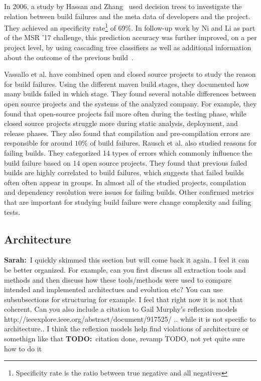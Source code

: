 \documentclass[sigplan, anonymous, review]{acmart}
\newcommand{\sn}[1]{{\color{blue}\textbf{Sarah:}~#1}}
\newcommand{\todo}[1]{{ \color{red} \textbf{TODO:}~#1}}
\begin{document}
In 2006, a study by Hassan and Zhang~\cite{Pred-Tree} used decision trees to investigate the relation between build failures and the meta data of developers and the project.
They achieved an specificity rate\footnote{Specificity rate is the ratio between true negative and all negatives} of 69\%.
In follow-up work by Ni and Li as part of the MSR '17 challenge, this prediction accuracy was further improved, on a per project level, by using cascading tree classifiers as well as additional information about the outcome of the previous build~\cite{Pred-Cascade}. 

Vassallo et al. \cite{CIFailTypes} have combined open and closed source projects to study the reason for build failures. Using the different maven build stages, they documented how many builds failed in which stage. They found several notable differences between open source projects and the systems of the analyzed company. For example, they found that open-source projects fail more often during the testing phase, while closed source projects struggle more during static analysis, deployment, and release phases. They also found that compilation and pre-compilation errors are responsible for around $10\%$ of build failures.
Rausch et al. \cite{FailsinCIFlow} also studied reasons for failing builds. They categorized 14 types of errors which commonly influence the build failure based on 14 open source projects. They found that previous failed builds are highly correlated to build failures, which suggests that failed builds often often appear in groups. In almost all of the studied projects, compilation and dependency resolution were issues for failing builds. Other confirmed metrics that are important for studying build failure were change complexity and failing tests.

\subsection{Architecture}
\label{sec:relwork-arch}

\sn{I quickly skimmed this section but will come back it again. I feel it can be better organized. For example, can you first discuss all extraction tools and methods and then discuss how these tools/methods were used to compare intended and implemented architectues and evolution etc? You can use subsubsections for structuring for example. I feel that right  now it is not that coherent. Can you also include a citation to Gail Murphy's reflexion models http://ieeexplore.ieee.org/abstract/document/917525/ .. while it is not specific to architecture.. I think the reflexion models help find violations of architecture or somethign like that} \todo{citation done, revamp TODO, not yet quite sure how to do it}
\end{document}
